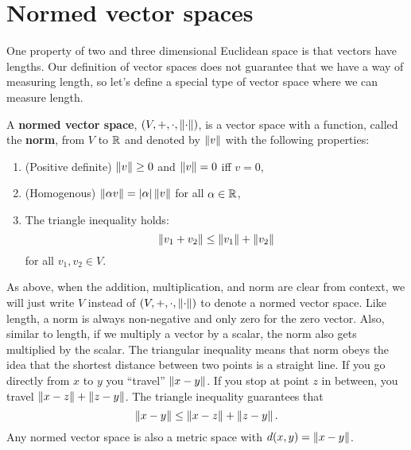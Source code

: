 \section{Normed vector spaces}

One property of two and three dimensional Euclidean space is that
vectors have lengths. Our definition of vector spaces does not
guarantee that we have a way of measuring length, so let's define a
special type of vector space where we can measure length. 
\begin{definition}
  A \textbf{normed vector space}, $(V,+,\cdot, \left\Vert {\cdot} \right\Vert)$, is a
  vector space with a function, called the \textbf{norm}, from $V$ to
  $\mathbb{R}$ and denoted by $\left\Vert {v} \right\Vert$ with the following properties:
  \begin{enumerate}
  \item (Positive definite) $\left\Vert {v} \right\Vert \geq 0$ and $\left\Vert {v} \right\Vert = 0$ iff $v = 0$,
  \item (Homogenous) $\left\Vert {\alpha v} \right\Vert = |\alpha|\left\Vert {v} \right\Vert$ for all $\alpha \in \mathbb{R}$,
  \item The triangle inequality holds:
    \[ \left\Vert {v_1+v_2} \right\Vert \leq \left\Vert {v_1} \right\Vert + \left\Vert {v_2} \right\Vert \]
    for all $v_1, v_2 \in V$.
  \end{enumerate}
\end{definition}
As above, when the addition, multiplication,
and norm are clear from context, we will just write $V$ instead of
$(V,+,\cdot, \left\Vert {\cdot} \right\Vert)$ to denote a normed vector space. 
Like length, a norm is always non-negative and only zero for the zero
vector. Also, similar to length, if we multiply a vector by a scalar,
the norm also gets multiplied by the scalar. The triangular inequality
means that norm obeys the idea that the shortest distance between two
points is a straight line. If you go directly from $x$ to $y$ you
``travel'' $\left\Vert {x - y} \right\Vert$. If you stop at point $z$ in between, you travel
$\left\Vert {x - z} \right\Vert + \left\Vert {z - y} \right\Vert$. The triangle inequality guarantees that 
\[ \left\Vert {x-y} \right\Vert \leq \left\Vert {x - z} \right\Vert + \left\Vert {z - y} \right\Vert. \]
Any normed vector space is also a metric space with $d(x,y) = \left\Vert {x
  - y} \right\Vert$. 

